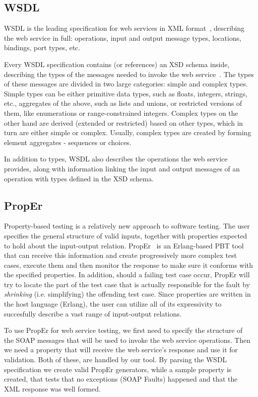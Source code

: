 \documentclass[submission,copyright]{eptcs}
\begin{document}
\subsection{WSDL}

WSDL is the leading specification for web services in XML
format~\cite{wsdl_spec}, describing the web service in full:
operations, input and output message types, locations, bindings, port
types, etc.

Every WSDL specification contains (or references) an XSD schema
inside, describing the types of the messages needed to invoke the web
service~\cite{xsd_structure_spec,xsd_datatypes_spec}. The types of
these messages are divided in two large categories: simple and complex
types. Simple types can be either primitive data types, such as
floats, integers, strings, etc., aggregates of the above, such as
lists and unions, or restricted versions of them, like enumerations or
range-constrained integers. Complex types on the other hand are
derived (extended or restricted) based on other types, which in turn
are either simple or complex. Usually, complex types are created by
forming element aggregates - sequences or choices.

In addition to types, WSDL also describes the operations the web
service provides, along with information linking the input and output
messages of an operation with types defined in the XSD schema.

\subsection{PropEr}

Property-based testing is a relatively new approach to software
testing. The user specifies the general structure of valid inputs,
together with properties expected to hold about the input-output
relation. PropEr~\cite{proper_tool} is an Erlang-based PBT tool that
can receive this information and create progressively more complex
test cases, execute them and then monitor the response to make sure it
conforms with the specified properties. In addition, should a failing
test case occur, PropEr will try to locate the part of the test case
that is actually responsible for the fault by \emph{shrinking} (i.e.
simplifying) the offending test case. Since properties are written in
the host language (Erlang), the user can utilize all of its
expressivity to succesfully describe a vast range of input-output
relations.

To use PropEr for web service testing, we first need to specify the structure
of the SOAP messages that will be used to invoke the web service operations. 
Then we need a property that will receive the web service's response and use 
it for validation. Both of these, are handled by our tool. By parsing the 
WSDL specification we create valid PropEr generators, while a sample property
is created, that tests that no exceptions (SOAP Faults) happened and that the 
XML response was well formed.
\end{document}
